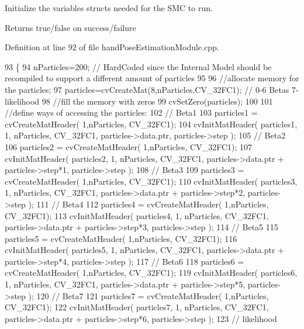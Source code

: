Initialize the variables structs needed for the S\+MC to run. 

\begin{DoxyReturn}{Returns}
true/false on success/failure 
\end{DoxyReturn}


Definition at line 92 of file hand\+Pose\+Estimation\+Module.\+cpp.


\begin{DoxyCode}
93 \{
94     nParticles=200; \textcolor{comment}{// HardCoded since the Internal Model should be recompiled to support a different
       amount of particles}
95 
96     \textcolor{comment}{//allocate memory for the particles;}
97     particles=cvCreateMat(8,nParticles,CV\_32FC1); \textcolor{comment}{// 0-6 Betas 7- likelihood}
98     \textcolor{comment}{//fill the memory with zeros}
99     cvSetZero(particles);
100 
101     \textcolor{comment}{//define ways of accessing the particles:}
102     \textcolor{comment}{// Beta1}
103     particles1 = cvCreateMatHeader( 1,nParticles, CV\_32FC1);
104     cvInitMatHeader( particles1, 1, nParticles, CV\_32FC1, particles->data.ptr, particles->step );
105     \textcolor{comment}{// Beta2}
106     particles2 = cvCreateMatHeader( 1,nParticles, CV\_32FC1);
107     cvInitMatHeader( particles2, 1, nParticles, CV\_32FC1, particles->data.ptr + particles->step*1, 
      particles->step );
108     \textcolor{comment}{// Beta3}
109     particles3 = cvCreateMatHeader( 1,nParticles, CV\_32FC1);
110     cvInitMatHeader( particles3, 1, nParticles, CV\_32FC1, particles->data.ptr + particles->step*2, 
      particles->step );
111     \textcolor{comment}{// Beta4}
112     particles4 = cvCreateMatHeader( 1,nParticles, CV\_32FC1);
113     cvInitMatHeader( particles4, 1, nParticles, CV\_32FC1, particles->data.ptr + particles->step*3, 
      particles->step );
114     \textcolor{comment}{// Beta5}
115     particles5 = cvCreateMatHeader( 1,nParticles, CV\_32FC1);
116     cvInitMatHeader( particles5, 1, nParticles, CV\_32FC1, particles->data.ptr + particles->step*4, 
      particles->step );
117     \textcolor{comment}{// Beta6}
118     particles6 = cvCreateMatHeader( 1,nParticles, CV\_32FC1);
119     cvInitMatHeader( particles6, 1, nParticles, CV\_32FC1, particles->data.ptr + particles->step*5, 
      particles->step );
120     \textcolor{comment}{// Beta7}
121     particles7 = cvCreateMatHeader( 1,nParticles, CV\_32FC1);
122     cvInitMatHeader( particles7, 1, nParticles, CV\_32FC1, particles->data.ptr + particles->step*6, 
      particles->step );
123     \textcolor{comment}{// likelihood}

\end{DoxyCode}
